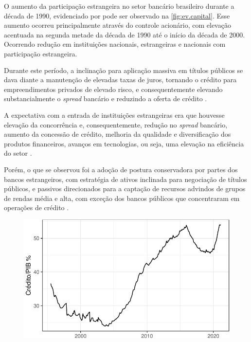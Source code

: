 \documentclass[12pt,openright,oneside,a4paper,chapter=TITLE,section=TITLE,subsection=TITLE,english,french,spanish,portugues,sumario=tradicional]{04-class-files/abntex2}
\begin{document}
O aumento da participação estrangeira no setor bancário brasileiro durante a
década de 1990, evidenciado por \textcite{camargo:2009} pode ser observado na
\autoref{fig:ev.capital}. Esse aumento ocorreu principalmente através do
controle acionário, com elevação acentuada na segunda metade da década de 1990
até o início da década de 2000. Ocorrendo redução em instituições
nacionais, estrangeiras e nacionais com participação estrangeira.

Durante este período, a inclinação para aplicação massiva em títulos públicos
se dava diante a manutenção de elevadas taxas de juros, tornando o crédito para
empreendimentos privados de elevado risco, e consequentemente elevando
substancialmente o \emph{spread} bancário e reduzindo a oferta de crédito
\cite{camargo:2009}.

A expectativa com a entrada de instituições estrangeiras era que houvesse
elevação da concorrência e, consequentemente, redução no \emph{spread} bancário,
aumento da concessão de crédito, melhoria da qualidade e diversificação dos
produtos financeiros, avanços em tecnologias, ou seja, uma elevação na
eficiência do setor \cite{camargo:2009}.

Porém, o que se observou foi a adoção de postura conservadora por partes dos
bancos estrangeiros, com estratégia de ativos inclinada para negociação de
títulos públicos, e passivos direcionados para a captação de recursos advindos
de grupos de rendas média e alta, com exceção dos bancos públicos que
concentraram em operações de crédito \cite{camargo:2009}.

\begin{figure}

\begin{center}\includegraphics{12-exportedfigures/credit gdp-1} \end{center}
\label{fig:credgdp}
\end{figure}
\end{document}
